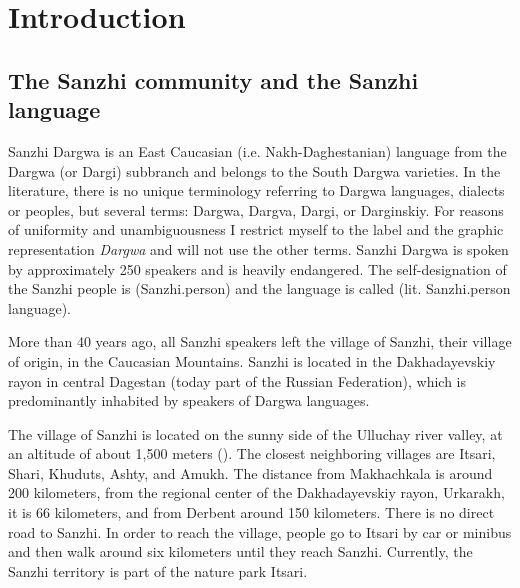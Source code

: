 


\chapter{Introduction}
\label{cpt:Introduction}


\section{The Sanzhi community and the Sanzhi language}
\label{sec:The Sanzhi community and the Sanzhi language}

Sanzhi Dargwa is an East Caucasian (i.e. Nakh-Daghestanian) language from the Dargwa (or Dargi) subbranch and belongs to the South Dargwa varieties. In the literature, there is no unique terminology referring to Dargwa languages, dialects or peoples, but several terms: Dargwa, Dargva, Dargi, or Darginskiy. For reasons of uniformity and unambiguousness I restrict myself to the label and the graphic representation \textit{Dargwa} and will not use the other terms. Sanzhi Dargwa is spoken by approximately 250 speakers and is heavily endangered. The self-designation of the Sanzhi people is  (Sanzhi.person) and the language is called  (lit. Sanzhi.person language).

More than 40 years ago, all Sanzhi speakers left the village of Sanzhi, their village of origin, in the Caucasian Mountains. Sanzhi is located in the Dakhadayevskiy rayon in central Dagestan (today part of the Russian Federation), which is predominantly inhabited by speakers of Dargwa languages.

The village of Sanzhi is located on the sunny side of the Ulluchay river valley, at an altitude of about 1,500 meters (). The closest neighboring villages are Itsari, Shari, Khuduts, Ashty, and Amukh. The distance from Makhachkala is around 200 kilometers, from the regional center of the Dakhadayevskiy rayon, Urkarakh, it is 66 kilometers, and from Derbent around 150 kilometers. There is no direct road to Sanzhi. In order to reach the village, people go to Itsari by car or minibus and then walk around six kilometers until they reach Sanzhi. Currently, the Sanzhi territory is part of the nature park Itsari.

